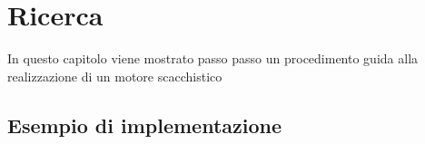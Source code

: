 \chapter{Ricerca}
\label{ricerca}
%

\begin{citazione}
    In questo capitolo viene mostrato passo passo un procedimento guida alla realizzazione di un motore scacchistico
\end{citazione}

\newpage


\section{Esempio di implementazione}